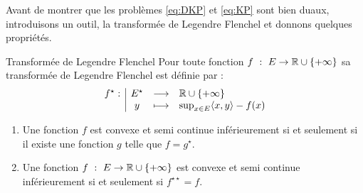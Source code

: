 \documentclass[a4paper,12pt]{article}
\begin{document}
Avant de montrer que les problèmes \eqref{eq:DKP} et \eqref{eq:KP} sont bien duaux, introduisons un outil, la transformée de Legendre Flenchel et donnons quelques propriétés. 
\begin{definition}{Transformée de Legendre Flenchel}
Pour toute fonction $f\ :\ E\rightarrow \mathbb{R}\cup\{+\infty\}$ sa transformée de Legendre Flenchel est définie par :
\begin{align}
\begin{array}[t]{l|ccl} f^{\star}: & E^{\star} & \longrightarrow &  \mathbb{R}\cup\{+\infty\} \\ & y & \longmapsto & \sup_{x\in E}\langle x,y\rangle -f(x) \end{array}
\end{align}
\end{definition}
\begin{propriete}
\begin{enumerate}
\item Une fonction $f$ est convexe et semi continue inférieurement si et seulement si il existe une fonction $g$ telle que $f=g^{\star}$.
\item Une fonction $f\ :\ E\rightarrow \mathbb{R}\cup\{+\infty\}$ est convexe et semi continue inférieurement si et seulement si $f^{\star\star}=f$.
\end{enumerate}
\end{propriete}
\end{document}
